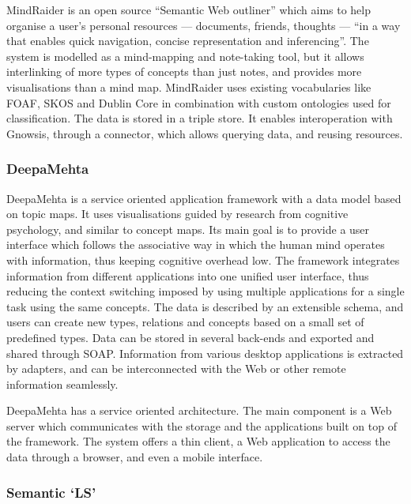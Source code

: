 MindRaider \cite{MindRaider} is an open source ``Semantic Web outliner'' which aims to help organise a user's personal resources --- documents, friends, thoughts --- ``in a way that enables quick navigation, concise representation and inferencing''. The system is modelled as a mind-mapping and note-taking tool, but it allows interlinking of more types of concepts than just notes, and provides more visualisations than a mind map.
MindRaider uses existing vocabularies like FOAF, SKOS and Dublin Core in combination with custom ontologies used for classification. The data is stored in a triple store. 
It enables interoperation with Gnowsis, through a connector, which allows querying data, and reusing resources. 

\subsubsection{DeepaMehta}

DeepaMehta \cite{Richter2005} is a service oriented application framework with a data model based on topic maps. It uses visualisations guided by research from cognitive psychology, and similar to concept maps. Its main goal is to provide a user interface which follows the associative way in which the human mind operates with information, thus keeping cognitive overhead low. The framework integrates information from different applications into one unified user interface, thus reducing the context switching imposed by using multiple applications for a single task using the same concepts. The data is described by an extensible schema, and users can create new types, relations and concepts based on a small set of predefined types. Data can be stored in several back-ends and exported and shared through SOAP. Information from various desktop applications is extracted by adapters, and can be interconnected with the Web or other remote information seamlessly. 

DeepaMehta has a service oriented architecture. The main component is a Web server which communicates with the storage and the applications built on top of the framework. The system offers a thin client, a Web application to access the data through a browser, and even a mobile interface.

\subsubsection{Semantic \textquoteleft LS\textquoteright}

